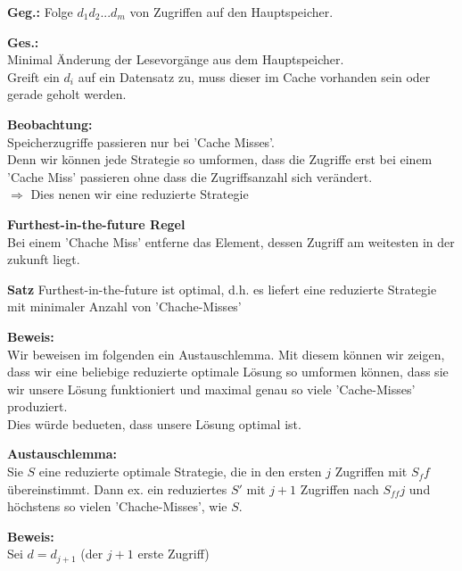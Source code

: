 \begin{description}

\item{\bfseries Geg.:} Folge $d_1d_2 ... d_m$ von Zugriffen auf den Hauptspeicher.

\item{\bfseries Ges.:} \\
Minimal Änderung der Lesevorgänge aus dem Hauptspeicher.\\

Greift ein $d_i$ auf ein Datensatz zu, muss dieser im Cache vorhanden sein oder gerade geholt werden.

\item{\bfseries Beobachtung:}\\
Speicherzugriffe passieren nur bei 'Cache Misses'.\\

Denn wir können jede Strategie so umformen, dass die Zugriffe erst bei einem 'Cache Miss' passieren ohne dass die Zugriffsanzahl sich verändert.\\
$\Rightarrow$ Dies nenen wir eine reduzierte Strategie

\item{\bfseries Furthest-in-the-future Regel}\\
Bei einem 'Chache Miss' entferne das Element, dessen Zugriff am weitesten in der zukunft liegt.

\item{\bfseries Satz} Furthest-in-the-future ist optimal, d.h. es liefert eine reduzierte Strategie mit minimaler Anzahl von 'Chache-Misses'

\item{\bfseries Beweis:}\\
Wir beweisen im folgenden ein Austauschlemma. Mit diesem können wir zeigen, dass wir eine beliebige reduzierte optimale Lösung so umformen können, dass sie wir unsere Lösung funktioniert und maximal genau so viele 'Cache-Misses' produziert.\\
Dies würde bedueten, dass unsere Lösung optimal ist.

\item{\bfseries Austauschlemma:}\\
Sie $S$ eine reduzierte optimale Strategie, die in den ersten $j$ Zugriffen mit $S_ff$ übereinstimmt. Dann ex. ein reduziertes $S'$ mit $j+1$ Zugriffen nach $S_{ff}j$ und höchstens so vielen 'Chache-Misses', wie $S$.

\item{\bfseries Beweis:}\\
Sei $d=d_{j+1}$ (der $j+1$ erste Zugriff)
\begin{description}


\end{description}
\end{description}
